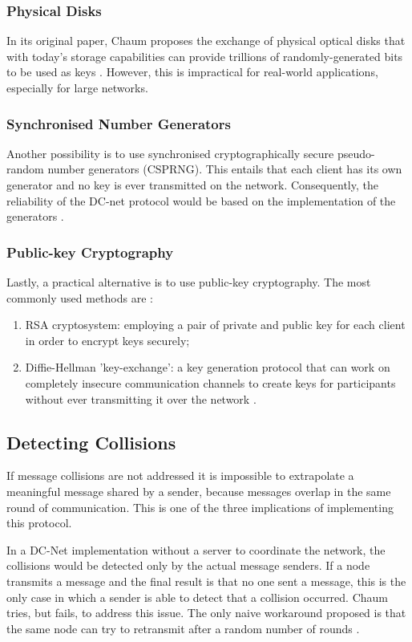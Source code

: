 \subsubsection{Physical Disks}
In its original paper, Chaum proposes the exchange of physical optical disks that with today's storage capabilities can provide trillions of randomly-generated bits to be used as keys \cite{Chaum}. However, this is impractical for real-world applications, especially for large networks. 

\subsubsection{Synchronised Number Generators}
Another possibility is to use synchronised cryptographically secure pseudo-random number generators (CSPRNG). This entails that each client has its own generator and no key is ever transmitted on the network. Consequently, the reliability of the DC-net protocol would be based on the implementation of the generators \cite{Chaum}.

\subsubsection{Public-key Cryptography}
Lastly, a practical alternative is to use public-key cryptography. The most commonly used methods are \cite{Chaum}:
\begin{enumerate}
    \item RSA cryptosystem: employing a pair of private and public key for each client in order to encrypt keys securely;
    \item Diffie-Hellman 'key-exchange': a key generation protocol that can work on completely insecure communication channels to create keys for participants without ever transmitting it over the network \cite{Golle}.
\end{enumerate}


\subsection{Detecting Collisions} \label{sec:detectCollisions}
If message collisions are not addressed it is impossible to extrapolate a meaningful message shared by a sender, because messages overlap in the same round of communication. This is one of the three implications of implementing this protocol. \newline

In a DC-Net implementation without a server to coordinate the network, the collisions would be detected only by the actual message senders. If a node transmits a message and the final result is that no one sent a message, this is the only case in which a sender is able to detect that a collision occurred. Chaum tries, but fails, to address this issue. The only naive workaround proposed is that the same node can try to retransmit after a random number of rounds \cite{Chaum}. \newline


